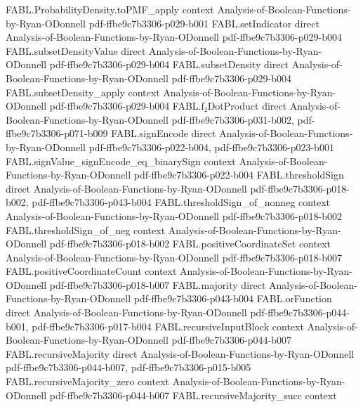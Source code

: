 \begin{theorem}
\proofstep
  {FABL.ProbabilityDensity.toPMF_apply}
  {context}
  {Analysis-of-Boolean-Functions-by-Ryan-ODonnell}
  {pdf-ffbe9c7b3306-p029-b001}
\proofstep
  {FABL.setIndicator}
  {direct}
  {Analysis-of-Boolean-Functions-by-Ryan-ODonnell}
  {pdf-ffbe9c7b3306-p029-b004}
\proofstep
  {FABL.subsetDensityValue}
  {direct}
  {Analysis-of-Boolean-Functions-by-Ryan-ODonnell}
  {pdf-ffbe9c7b3306-p029-b004}
\proofstep
  {FABL.subsetDensity}
  {direct}
  {Analysis-of-Boolean-Functions-by-Ryan-ODonnell}
  {pdf-ffbe9c7b3306-p029-b004}
\proofstep
  {FABL.subsetDensity_apply}
  {context}
  {Analysis-of-Boolean-Functions-by-Ryan-ODonnell}
  {pdf-ffbe9c7b3306-p029-b004}
\proofstep
  {FABL.f₂DotProduct}
  {direct}
  {Analysis-of-Boolean-Functions-by-Ryan-ODonnell}
  {pdf-ffbe9c7b3306-p031-b002,
    pdf-ffbe9c7b3306-p071-b009}
\proofstep
  {FABL.signEncode}
  {direct}
  {Analysis-of-Boolean-Functions-by-Ryan-ODonnell}
  {pdf-ffbe9c7b3306-p022-b004,
    pdf-ffbe9c7b3306-p023-b001}
\proofstep
  {FABL.signValue_signEncode_eq_binarySign}
  {context}
  {Analysis-of-Boolean-Functions-by-Ryan-ODonnell}
  {pdf-ffbe9c7b3306-p022-b004}
\proofstep
  {FABL.thresholdSign}
  {direct}
  {Analysis-of-Boolean-Functions-by-Ryan-ODonnell}
  {pdf-ffbe9c7b3306-p018-b002,
    pdf-ffbe9c7b3306-p043-b004}
\proofstep
  {FABL.thresholdSign_of_nonneg}
  {context}
  {Analysis-of-Boolean-Functions-by-Ryan-ODonnell}
  {pdf-ffbe9c7b3306-p018-b002}
\proofstep
  {FABL.thresholdSign_of_neg}
  {context}
  {Analysis-of-Boolean-Functions-by-Ryan-ODonnell}
  {pdf-ffbe9c7b3306-p018-b002}
\proofstep
  {FABL.positiveCoordinateSet}
  {context}
  {Analysis-of-Boolean-Functions-by-Ryan-ODonnell}
  {pdf-ffbe9c7b3306-p018-b007}
\proofstep
  {FABL.positiveCoordinateCount}
  {context}
  {Analysis-of-Boolean-Functions-by-Ryan-ODonnell}
  {pdf-ffbe9c7b3306-p018-b007}
\proofstep
  {FABL.majority}
  {direct}
  {Analysis-of-Boolean-Functions-by-Ryan-ODonnell}
  {pdf-ffbe9c7b3306-p043-b004}
\proofstep
  {FABL.orFunction}
  {direct}
  {Analysis-of-Boolean-Functions-by-Ryan-ODonnell}
  {pdf-ffbe9c7b3306-p044-b001,
    pdf-ffbe9c7b3306-p017-b004}
\proofstep
  {FABL.recursiveInputBlock}
  {context}
  {Analysis-of-Boolean-Functions-by-Ryan-ODonnell}
  {pdf-ffbe9c7b3306-p044-b007}
\proofstep
  {FABL.recursiveMajority}
  {direct}
  {Analysis-of-Boolean-Functions-by-Ryan-ODonnell}
  {pdf-ffbe9c7b3306-p044-b007,
    pdf-ffbe9c7b3306-p015-b005}
\proofstep
  {FABL.recursiveMajority_zero}
  {context}
  {Analysis-of-Boolean-Functions-by-Ryan-ODonnell}
  {pdf-ffbe9c7b3306-p044-b007}
\proofstep
  {FABL.recursiveMajority_succ}
  {context}

\end{theorem}
